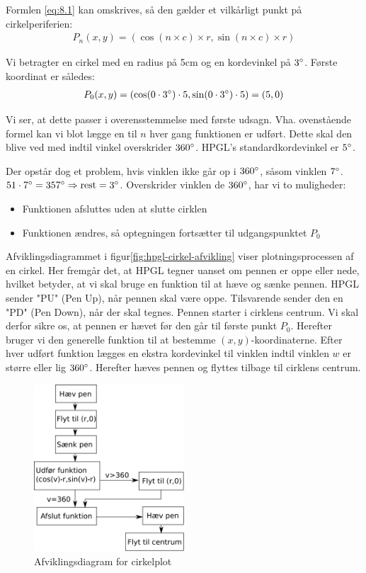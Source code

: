 Formlen \vref{eq:8.1} kan omskrives, så den gælder et vilkårligt punkt
på cirkelperiferien:
\begin{align}
P_n(x, y)=(\cos(n\times c)\times r, \sin(n\times c)\times r)
\end{align}

Vi betragter en cirkel med en radius på 5cm og en kordevinkel på
$3^\circ$. Første koordinat er således:
\begin{align*}
  P_0(x, y)&=(\cos(0\cdot 3^\circ)\cdot 5 , \sin(0\cdot 3^\circ)\cdot 5)=(5, 0) \\
\end{align*}

Vi ser, at dette passer i overensstemmelse med første
udsagn. Vha. ovenstående formel kan vi blot lægge en til $n$ hver gang
funktionen er udført. Dette skal den blive ved med indtil vinkel
overskrider $360^\circ$. HPGL's standardkordevinkel er $5^\circ$.


Der opstår dog et problem, hvis vinklen ikke går op i $360^\circ$,
såsom vinklen $7^\circ$. $51\cdot 7^\circ = 357^\circ \Rightarrow
\textup{rest} = 3^\circ$. Overskrider vinklen de $360^\circ$, har vi to
muligheder:
\begin{itemize} \firmlist
\item Funktionen afsluttes uden at slutte cirklen
\item Funktionen ændres, så optegningen fortsætter til udgangspunktet $P_0$
\end{itemize}

Afviklingsdiagrammet i figur\vref{fig:hpgl-cirkel-afvikling}
viser plotningsprocessen af en cirkel. Her fremgår det, at
HPGL tegner uanset om pennen er oppe eller nede, hvilket betyder, at
vi skal bruge en funktion til at hæve og sænke pennen. HPGL sender
"PU" (Pen Up), når pennen skal være oppe. Tilsvarende sender den en
"PD" (Pen Down), når der skal tegnes. Pennen starter i cirklens
centrum. Vi skal derfor sikre os, at pennen er hævet før den går til
første punkt $P_0$. Herefter bruger vi den generelle funktion til at
bestemme $(x, y)$-koordinaterne. Efter hver udført funktion lægges en
ekstra kordevinkel til vinklen indtil vinklen $w$ er større eller lig
$360^\circ$. Herefter hæves pennen og flyttes tilbage til cirklens
centrum.

\begin{figure}[htbp]
  \centering
  \includegraphics[width=0.5\textwidth]{./img/afviklingsdiagram-cirkel}
  \caption{Afviklingsdiagram for cirkelplot}
  \label{fig:hpgl-cirkel-afvikling}
\end{figure}


